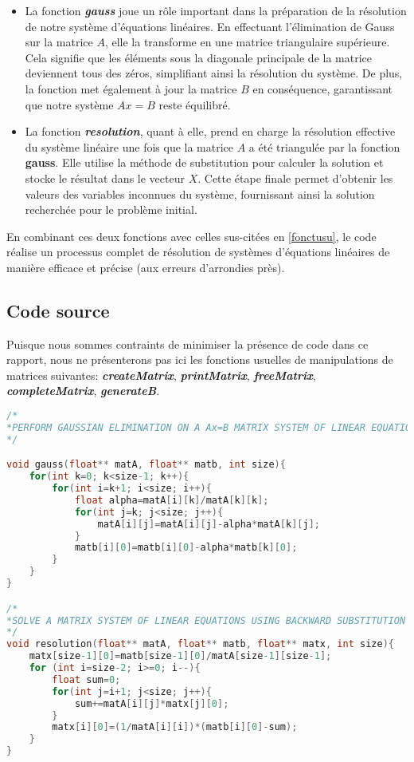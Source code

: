 \begin{itemize}
\item La fonction \textit{\textbf{gauss}} joue un rôle important dans la préparation de la résolution de notre système d'équations linéaires. En effectuant l'élimination de Gauss sur la matrice $A$, elle la transforme en une matrice triangulaire supérieure. Cela signifie que les éléments sous la diagonale principale de la matrice deviennent tous des zéros, simplifiant ainsi la résolution du système. De plus, la fonction met également à jour la matrice $B$ en conséquence, garantissant que notre système $Ax=B$ reste équilibré.\\

\item La fonction \textit{\textbf{resolution}}, quant à elle, prend en charge la résolution effective du système linéaire une fois que la matrice $A$ a été triangulée par la fonction \textbf{gauss}. Elle utilise la méthode de substitution pour calculer la solution et stocke le résultat dans le vecteur $X$. Cette étape finale permet d'obtenir les valeurs des variables inconnues du système, fournissant ainsi la solution recherchée pour le problème initial.\\
\end{itemize}


En combinant ces deux fonctions avec celles sus-citées en \ref{fonctusu}, le code réalise un processus complet de résolution de systèmes d'équations linéaires de manière efficace et précise (aux erreurs d'arrondies près).\\
\newpage
\subsection{Code source}
Puisque nous sommes contraints de minimiser la présence de code dans ce rapport, nous ne présenterons pas ici les fonctions usuelles de manipulations de matrices suivantes: \textit{\textbf{createMatrix}},  \textit{\textbf{printMatrix}},  \textit{\textbf{freeMatrix}},  \textit{\textbf{completeMatrix}},  \textit{\textbf{generateB}}.\\

\begin{lstlisting}[language=C,inputencoding=utf8, basicstyle=\fontsize{8}{10}\selectfont]
/*
*PERFORM GAUSSIAN ELIMINATION ON A Ax=B MATRIX SYSTEM OF LINEAR EQUATIONS
*/

void gauss(float** matA, float** matb, int size){
	for(int k=0; k<size-1; k++){
		for(int i=k+1; i<size; i++){
			float alpha=matA[i][k]/matA[k][k];
			for(int j=k; j<size; j++){
				matA[i][j]=matA[i][j]-alpha*matA[k][j];
			}
			matb[i][0]=matb[i][0]-alpha*matb[k][0];
		}
	}
}

/*
*SOLVE A MATRIX SYSTEM OF LINEAR EQUATIONS USING BACKWARD SUBSTITUTION
*/
void resolution(float** matA, float** matb, float** matx, int size){
	matx[size-1][0]=matb[size-1][0]/matA[size-1][size-1];
	for (int i=size-2; i>=0; i--){
		float sum=0;
		for(int j=i+1; j<size; j++){
			sum+=matA[i][j]*matx[j][0];
		}
		matx[i][0]=(1/matA[i][i])*(matb[i][0]-sum);
	}
}
\end{lstlisting}
\newpage

